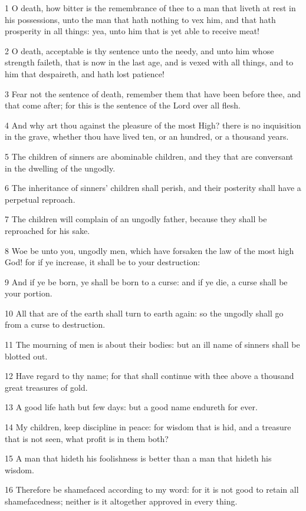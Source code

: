 \par 1 O death, how bitter is the remembrance of thee to a man that liveth at rest in his possessions, unto the man that hath nothing to vex him, and that hath prosperity in all things: yea, unto him that is yet able to receive meat!
\par 2 O death, acceptable is thy sentence unto the needy, and unto him whose strength faileth, that is now in the last age, and is vexed with all things, and to him that despaireth, and hath lost patience!
\par 3 Fear not the sentence of death, remember them that have been before thee, and that come after; for this is the sentence of the Lord over all flesh.
\par 4 And why art thou against the pleasure of the most High? there is no inquisition in the grave, whether thou have lived ten, or an hundred, or a thousand years.
\par 5 The children of sinners are abominable children, and they that are conversant in the dwelling of the ungodly.
\par 6 The inheritance of sinners' children shall perish, and their posterity shall have a perpetual reproach.
\par 7 The children will complain of an ungodly father, because they shall be reproached for his sake.
\par 8 Woe be unto you, ungodly men, which have forsaken the law of the most high God! for if ye increase, it shall be to your destruction:
\par 9 And if ye be born, ye shall be born to a curse: and if ye die, a curse shall be your portion.
\par 10 All that are of the earth shall turn to earth again: so the ungodly shall go from a curse to destruction.
\par 11 The mourning of men is about their bodies: but an ill name of sinners shall be blotted out.
\par 12 Have regard to thy name; for that shall continue with thee above a thousand great treasures of gold.
\par 13 A good life hath but few days: but a good name endureth for ever.
\par 14 My children, keep discipline in peace: for wisdom that is hid, and a treasure that is not seen, what profit is in them both?
\par 15 A man that hideth his foolishness is better than a man that hideth his wisdom.
\par 16 Therefore be shamefaced according to my word: for it is not good to retain all shamefacedness; neither is it altogether approved in every thing.
